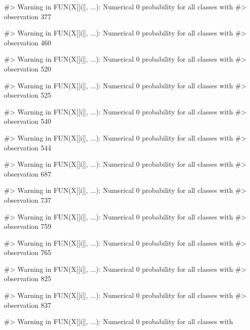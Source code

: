 \begin{Schunk}
\begin{Soutput}
#> Warning in FUN(X[[i]], ...): Numerical 0 probability for all classes with
#> observation 377
\end{Soutput}
\begin{Soutput}
#> Warning in FUN(X[[i]], ...): Numerical 0 probability for all classes with
#> observation 460
\end{Soutput}
\begin{Soutput}
#> Warning in FUN(X[[i]], ...): Numerical 0 probability for all classes with
#> observation 520
\end{Soutput}
\begin{Soutput}
#> Warning in FUN(X[[i]], ...): Numerical 0 probability for all classes with
#> observation 525
\end{Soutput}
\begin{Soutput}
#> Warning in FUN(X[[i]], ...): Numerical 0 probability for all classes with
#> observation 540
\end{Soutput}
\begin{Soutput}
#> Warning in FUN(X[[i]], ...): Numerical 0 probability for all classes with
#> observation 544
\end{Soutput}
\begin{Soutput}
#> Warning in FUN(X[[i]], ...): Numerical 0 probability for all classes with
#> observation 687
\end{Soutput}
\begin{Soutput}
#> Warning in FUN(X[[i]], ...): Numerical 0 probability for all classes with
#> observation 737
\end{Soutput}
\begin{Soutput}
#> Warning in FUN(X[[i]], ...): Numerical 0 probability for all classes with
#> observation 759
\end{Soutput}
\begin{Soutput}
#> Warning in FUN(X[[i]], ...): Numerical 0 probability for all classes with
#> observation 765
\end{Soutput}
\begin{Soutput}
#> Warning in FUN(X[[i]], ...): Numerical 0 probability for all classes with
#> observation 825
\end{Soutput}
\begin{Soutput}
#> Warning in FUN(X[[i]], ...): Numerical 0 probability for all classes with
#> observation 837
\end{Soutput}
\begin{Soutput}
#> Warning in FUN(X[[i]], ...): Numerical 0 probability for all classes with

\end{Soutput}
\end{Schunk}
